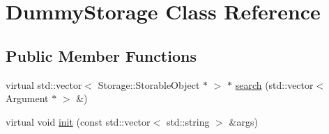 \hypertarget{classDummyStorage}{
\section{DummyStorage Class Reference}
\label{d0/df2/classDummyStorage}
}
\subsection*{Public Member Functions}
\begin{DoxyCompactItemize}
\item 
virtual std::vector$<$ Storage::StorableObject $\ast$ $>$ $\ast$ \hyperlink{classDummyStorage_adea6bbcbaacaea1a728f09602d7c8d1d}{search} (std::vector$<$ Argument $\ast$ $>$ \&)
\item 
virtual void \hyperlink{classDummyStorage_ac52f6e7c6941108e4686f606a4d88d6b}{init} (const std::vector$<$ std::string $>$ \&args)
\end{DoxyCompactItemize}
